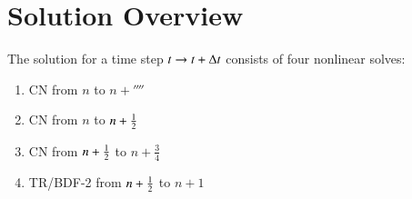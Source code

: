 \section{Solution Overview}
The solution for a time step $t\rightarrow t+\Delta t$ consists of four nonlinear
solves:

\begin{enumerate}
  \item CN from $n$ to $n+\fourth$
  \item CN from $n$ to $n+\frac{1}{2}$
  \item CN from $n+\frac{1}{2}$ to $n+\frac{3}{4}$
  \item TR/BDF-2 from $n+\frac{1}{2}$ to $n+1$
\end{enumerate}


